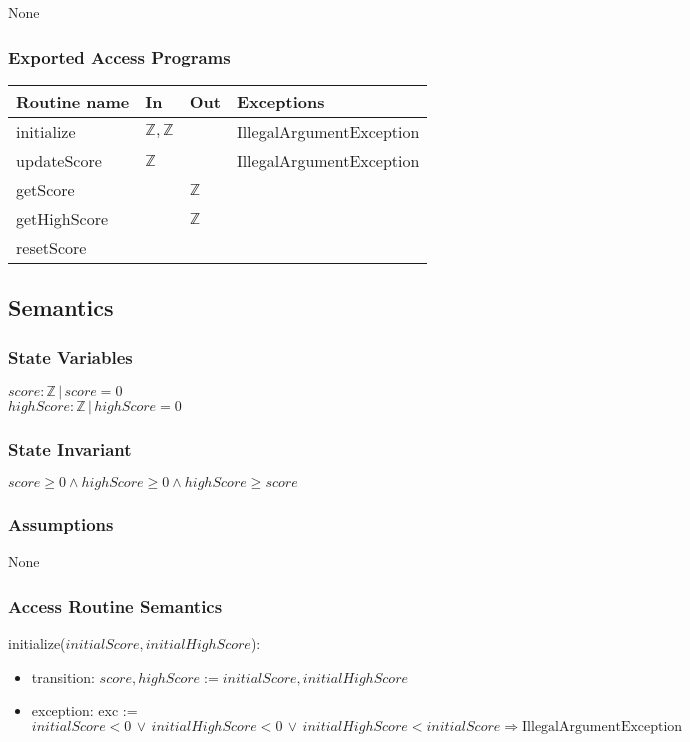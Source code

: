\documentclass[12pt]{article}
\begin{document}
None

\subsubsection* {Exported Access Programs}

\begin{tabular}{| l | l | l | p{6cm} |}
\hline
\textbf{Routine name} & \textbf{In} & \textbf{Out} & \textbf{Exceptions}\\
\hline
initialize & $\mathbb{Z}, \mathbb{Z}$ & & IllegalArgumentException \\
\hline
updateScore & $\mathbb{Z}$ & & IllegalArgumentException \\
\hline
getScore &  & $\mathbb{Z}$ &  \\
\hline
getHighScore &  & $\mathbb{Z}$ &  \\
\hline
resetScore &  &  &  \\
\hline
\end{tabular}

\subsection* {Semantics}

\subsubsection* {State Variables}

$score: \mathbb{Z} \, | \, score = 0$ \\
$highScore: \mathbb{Z} \, | \, highScore = 0$

\subsubsection* {State Invariant}

$score \geq 0 \wedge highScore \geq 0 \wedge highScore \geq score $

\subsubsection* {Assumptions}

None

\newpage

\subsubsection* {Access Routine Semantics}

\noindent initialize($initialScore, initialHighScore$):
\begin{itemize}
\item transition: $score, highScore := initialScore, initialHighScore$
\item exception: exc := $\mathit{initialScore} < 0 \, \vee \, \mathit{initialHighScore} < 0 \, \vee \, \mathit{initialHighScore} < \mathit{initialScore} \Rightarrow \text{IllegalArgumentException}$
\end{itemize}
\end{document}
